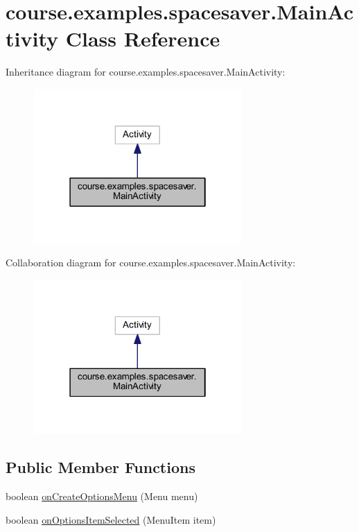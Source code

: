 \hypertarget{classcourse_1_1examples_1_1spacesaver_1_1_main_activity}{}\section{course.\+examples.\+spacesaver.\+Main\+Activity Class Reference}
\label{classcourse_1_1examples_1_1spacesaver_1_1_main_activity}


Inheritance diagram for course.\+examples.\+spacesaver.\+Main\+Activity\+:
\nopagebreak
\begin{figure}[H]
\begin{center}
\leavevmode
\includegraphics[width=226pt]{classcourse_1_1examples_1_1spacesaver_1_1_main_activity__inherit__graph}
\end{center}
\end{figure}


Collaboration diagram for course.\+examples.\+spacesaver.\+Main\+Activity\+:
\nopagebreak
\begin{figure}[H]
\begin{center}
\leavevmode
\includegraphics[width=226pt]{classcourse_1_1examples_1_1spacesaver_1_1_main_activity__coll__graph}
\end{center}
\end{figure}
\subsection*{Public Member Functions}
\begin{DoxyCompactItemize}
\item 
boolean \hyperlink{classcourse_1_1examples_1_1spacesaver_1_1_main_activity_a02f312998957aefd4c7a932532e48615}{on\+Create\+Options\+Menu} (Menu menu)
\item 
boolean \hyperlink{classcourse_1_1examples_1_1spacesaver_1_1_main_activity_a819d87dc906ff944c4f60cc044f05498}{on\+Options\+Item\+Selected} (Menu\+Item item)
\end{DoxyCompactItemize}
